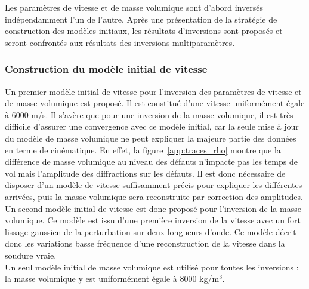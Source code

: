 Les paramètres de vitesse et de masse volumique sont d'abord inversés indépendamment l'un de l'autre. Après une présentation de la stratégie de construction des modèles initiaux, les résultats d'inversions sont proposés et seront confrontés aux résultats des inversions multiparamètres.



\subsubsection{Construction du modèle initial de vitesse}

Un premier modèle initial de vitesse pour l'inversion des paramètres de vitesse et de masse volumique est proposé. Il est constitué d'une vitesse uniformément égale à 6000 m/s. Il s'avère que pour une inversion de la masse volumique, il est très difficile d'assurer une convergence avec ce modèle initial, car la seule mise à jour du modèle de masse volumique ne peut expliquer la majeure partie des données en terme de cinématique. En effet, la figure~\ref{app:traces_rho} montre que la différence de masse volumique au niveau des défauts n'impacte pas les temps de vol mais l'amplitude des diffractions sur les défauts. Il est donc nécessaire de disposer d'un modèle de vitesse suffisamment précis pour expliquer les différentes arrivées, puis la masse volumique sera reconstruite par correction des amplitudes. \\

Un second modèle initial de vitesse est donc proposé pour l'inversion de la masse volumique. Ce modèle est issu d'une première inversion de la vitesse avec un fort lissage gaussien de la perturbation sur deux longueurs d'onde. Ce modèle décrit donc les variations basse fréquence d'une reconstruction de la vitesse dans la soudure vraie.\\

Un seul modèle initial de masse volumique est utilisé pour toutes les inversions : la masse volumique y est uniformément égale à 8000 kg/m$^{3}$.

